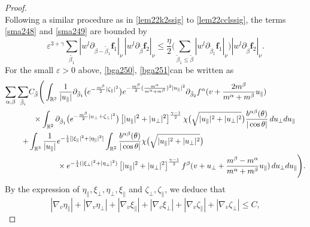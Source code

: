 \documentclass[reqno]{amsart}
\numberwithin{equation}{section}
\numberwithin{equation}{section}
\begin{document}
\begin{proof}
\begin{equation*}
		\end{equation*}
		Following a similar procedure as in \eqref{lem22k2ssig} to \eqref{lem22cclssig}, the terms \eqref{sma248} and \eqref{sma249} are bounded by
		\begin{equation*}
			\varepsilon^{3+\gamma}\sum_{\tilde{\beta_1}}|w^{l}\partial_{\tilde{\beta}-\tilde{\beta}_1}\mathbf{f}_1|_{\nu}\,|w^{l}\partial_{\tilde{\beta}}\mathbf{f}_2|_{\nu} \leq \frac{\eta}{2}\Big(\sum_{\tilde{\beta}_1\leq\tilde{\beta}}|w^{l}\partial_{\tilde{\beta}_1}\mathbf{f}_1|_{\nu}\Big)|w^{l}\partial_{\tilde{\beta}}\mathbf{f}_2|_{\nu}.
		\end{equation*}
		For the small $\varepsilon>0$ above, \eqref{bga250}, \eqref{bga251}can be written as
		\begin{align}
		\sum_{\alpha,\beta}\sum_{\tilde{\beta}_{i}}&C_{\tilde{\beta}}	\Bigg( \int_{\mathbb{R}^3} \frac{1}{|u_{\parallel}|} \partial_{\tilde{\beta}_1}\big(e^{-\frac{m^\beta}{2}|\zeta_{\parallel}|^2}\big) e^{-\frac{m^\beta}{2}(\frac{m^\alpha}{m^\alpha+m^\beta})^2|u_{\parallel}|^2}\partial_{\tilde{\beta}_2}f^\alpha(v + \frac{2m^{\beta}}{m^{\alpha}+m^{\beta}}u_{\parallel}) \label{CE2BDSefsD1}\\
			&\hspace{0.2cm}\times \int_{\mathbb{R}^2} \partial_{\tilde{\beta}_1}\big(e^{-\frac{m^\beta}{2}|u_{\perp} + \zeta_{\perp}|^2}\big) \left[|u_{\parallel}|^2 + |u_{\perp}|^2\right]^{\frac{\gamma - 1}{2}} \chi\big(\sqrt{|u_{\parallel}|^2 + |u_{\perp}|^2}\big) \frac{b^{ \alpha \beta}(\theta)}{|\cos \theta|} \, du_{\perp} du_{\parallel}\notag\\
			 +&\int_{\mathbb{R}^3} \frac{1}{|u_{\parallel}|} e^{-\frac{1}{4}[|\xi_{\parallel}|^2+|\eta_{\parallel}|^2]}\int_{\mathbb{R}^2} \frac{b^{ \alpha \beta}(\theta)}{|\cos \theta|}\chi\big(\sqrt{|u_{\parallel}|^2 + |u_{\perp}|^2}\big)  \label{CE2BDfSHHD2}\\
			&\hspace{1.3cm} \times  e^{-\frac{1}{4}(|\xi_{\perp}|^2+|\eta_{\perp}|^2) } \left[|u_{\parallel}|^2 + |u_{\perp}|^2\right]^{\frac{\gamma - 1}{2}}f^\beta(v + u_{\perp}+\frac{m^{\beta}-m^{\alpha}}{m^{\alpha}+m^{\beta}}u_{\parallel})  \, du_{\perp} du_{\parallel} \Bigg)\notag.
		\end{align}
		By the expression of  $\eta_{\parallel},\xi_{\perp},\eta_{\perp},\xi_{\parallel}$ and $\zeta_{\perp}, \zeta_{\parallel}$, we deduce that
		\begin{equation*}
			|\nabla_v \eta_{\parallel}|+|\nabla_v \eta_{\perp}|+|\nabla_v \xi_{\parallel}|+|\nabla_v \xi_{\perp}|+|\nabla_v \zeta_{\parallel}|+|\nabla_v \zeta_{\perp}| \leq C,

\end{equation*}
\end{proof}
\end{document}
